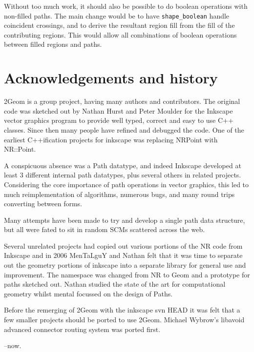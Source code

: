 \documentclass[openany]{book}
\begin{document}
Without too much work, it should also be possible to do boolean operations with non-filled paths. The main change would be to have \verb|shape_boolean| handle coincident crossings, and to derive the resultant region fill from the fill of the contributing regions. This would allow all combinations of boolean operations between filled regions and paths. 

\chapter{Acknowledgements and history}

2Geom is a group project, having many authors and contributors.  The
original code was sketched out by Nathan Hurst and Peter Moulder for
the Inkscape vector graphics program to provide well typed, correct
and easy to use C++ classes.  Since then many people have refined and
debugged the code.  One of the earliest C++ification projects for
inkscape was replacing NRPoint with NR::Point.

A conspicuous absence was a Path datatype, and indeed Inkscape
developed at least 3 different internal path datatypes, plus several
others in related projects.  Considering the core importance of path
operations in vector graphics, this led to much reimplementation of
algorithms, numerous bugs, and many round trips converting between
forms.

Many attempts have been made to try and develop a single path data
structure, but all were fated to sit in random SCMs scattered across
the web.

Several unrelated projects had copied out various portions of the NR
code from Inkscape and in 2006 MenTaLguY and Nathan felt that it was
time to separate out the geometry portions of inkscape into a
separate library for general use and improvement.  The namespace was
changed from NR to Geom and a prototype for paths sketched out.
Nathan studied the state of the art for computational geometry whilst
mental focussed on the design of Paths.

Before the remerging of 2Geom with the inkscape svn HEAD it was felt
that a few smaller projects should be ported to use 2Geom.  Michael
Wybrow's libavoid advanced connector routing system was ported first.

--now.

\pagebreak
\end{document}
